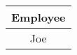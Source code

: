 \begin{tabular}{|c|}
    \hline
        \textbf{Employee} \\ \hline
        Joe \\ \hline
\end{tabular}